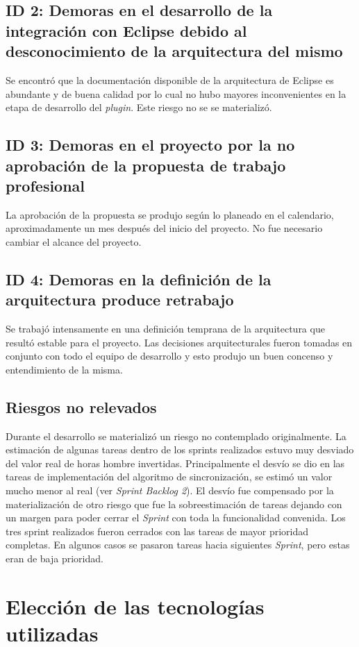 \documentclass[12pt,a4paper]{article}
\begin{document}
\subsection{ID 2: Demoras en el desarrollo de la integración con Eclipse debido al desconocimiento de la 
arquitectura del mismo}
Se encontró que la documentación disponible de la arquitectura de Eclipse es abundante y de buena calidad por
lo cual no hubo mayores inconvenientes en la etapa de desarrollo del \textit{plugin}. Este riesgo no se se
materializó.

\subsection{ID 3: Demoras en el proyecto por la no aprobación de la propuesta de trabajo profesional}
La aprobación de la propuesta se produjo según lo planeado en el calendario, aproximadamente un mes después del
inicio del proyecto. No fue necesario cambiar el alcance del proyecto.

\subsection{ID 4: Demoras en la definición de la arquitectura produce retrabajo}
Se trabajó intensamente en una definición temprana de la arquitectura que resultó estable para el proyecto. Las
decisiones arquitecturales fueron tomadas en conjunto con todo el equipo de desarrollo y esto produjo un buen
concenso y entendimiento de la misma.

\subsection{Riesgos no relevados}
Durante el desarrollo se materializó un riesgo no contemplado originalmente. La estimación de algunas tareas dentro
de los sprints realizados estuvo muy desviado del valor real de horas hombre invertidas. Principalmente el desvío se
dio en las tareas de implementación del algoritmo de sincronización, se estimó un valor mucho menor al real (ver
\textit{Sprint Backlog 2}). El desvío fue compensado por la materialización de otro riesgo que fue la sobreestimación
de tareas dejando con un margen para poder cerrar el \textit{Sprint} con toda la funcionalidad convenida.
Los tres sprint realizados fueron cerrados con las tareas de mayor prioridad completas. En algunos casos se pasaron 
tareas hacia siguientes \textit{Sprint}, pero estas eran de baja prioridad.

\section{Elección de las tecnologías utilizadas}
\end{document}
